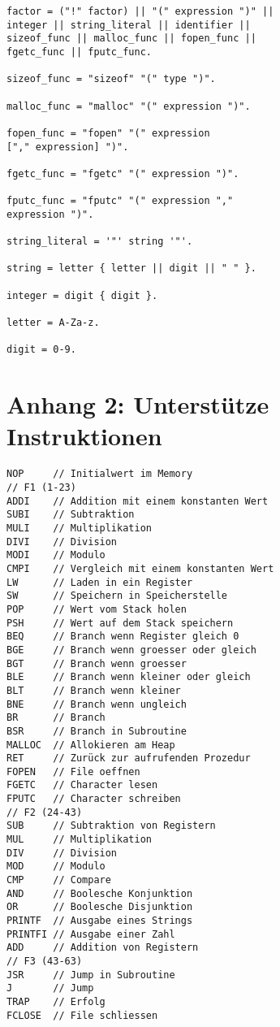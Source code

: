 \documentclass[a4paper,12pt]{article}
\begin{document}
\begin{lstlisting}
factor = ("!" factor) || "(" expression ")" || 
integer || string_literal || identifier || 
sizeof_func || malloc_func || fopen_func ||
fgetc_func || fputc_func.

sizeof_func = "sizeof" "(" type ")".

malloc_func = "malloc" "(" expression ")".

fopen_func = "fopen" "(" expression 
["," expression] ")".

fgetc_func = "fgetc" "(" expression ")".

fputc_func = "fputc" "(" expression ","
expression ")".

string_literal = '"' string '"'.

string = letter { letter || digit || " " }.

integer = digit { digit }.

letter = A-Za-z.

digit = 0-9.
	\end{lstlisting}
	
	\newpage
	\section{Anhang 2: Unterstütze Instruktionen}
	\begin{lstlisting}
NOP 	// Initialwert im Memory
// F1 (1-23)
ADDI	// Addition mit einem konstanten Wert
SUBI	// Subtraktion
MULI	// Multiplikation
DIVI	// Division
MODI	// Modulo
CMPI	// Vergleich mit einem konstanten Wert
LW  	// Laden in ein Register
SW  	// Speichern in Speicherstelle
POP 	// Wert vom Stack holen
PSH 	// Wert auf dem Stack speichern
BEQ 	// Branch wenn Register gleich 0
BGE 	// Branch wenn groesser oder gleich
BGT 	// Branch wenn groesser
BLE 	// Branch wenn kleiner oder gleich
BLT 	// Branch wenn kleiner
BNE 	// Branch wenn ungleich
BR  	// Branch
BSR 	// Branch in Subroutine
MALLOC 	// Allokieren am Heap
RET 	// Zurück zur aufrufenden Prozedur
FOPEN 	// File oeffnen
FGETC 	// Character lesen
FPUTC 	// Character schreiben
// F2 (24-43)
SUB 	// Subtraktion von Registern
MUL 	// Multiplikation
DIV 	// Division
MOD 	// Modulo
CMP 	// Compare
AND 	// Boolesche Konjunktion
OR  	// Boolesche Disjunktion
PRINTF 	// Ausgabe eines Strings
PRINTFI // Ausgabe einer Zahl
ADD 	// Addition von Registern
// F3 (43-63)
JSR 	// Jump in Subroutine
J   	// Jump
TRAP 	// Erfolg
FCLOSE 	// File schliessen	\end{lstlisting}
\end{document}
